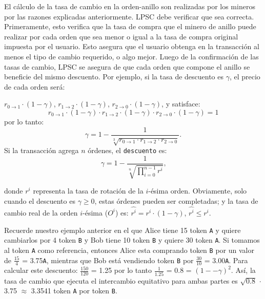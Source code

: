 \documentclass[UTF8,nofonts]{article}
\begin{document}
\begin{multicols}{2}
El c\'alculo de la tasa de cambio en la orden-anillo son realizadas por los mineros por las razones explicadas anteriormente. LPSC debe verificar que sea correcta. Primeramente, esto verifica que la tasa de compra que el minero de anillo puede realizar por cada orden que sea menor o igual a la tasa de compra original impuesta por el usuario. Esto asegura que el usuario obtenga en la transacci\'on al menos el tipo de cambio requerido, o algo mejor.			
Luego de la confirmaci\'on de las tasas de cambio, LPSC se asegura de que cada orden que compone el anillo se beneficie del mismo descuento. Por ejemplo, si la tasa de descuento es $\gamma$, el precio de cada orden ser\'a:

$r_{0\rightarrow 1} \cdot (1-\gamma)$, $r_{1\rightarrow 2} \cdot (1-\gamma)$, $r_{2 \rightarrow 0} \cdot (1-\gamma)$, y satisface: 
\begin{equation}
r_{0\rightarrow 1} \cdot (1-\gamma)\cdot r_{1\rightarrow 2} \cdot (1-\gamma) \cdot r_{2 \rightarrow 0} \cdot (1-\gamma) = 1
\end{equation}
por lo tanto: 
\begin{equation}
\gamma = 1- \frac{1}{\sqrt[3]{r_{0\rightarrow 1} \cdot r_{1\rightarrow 2} \cdot r_{2\rightarrow 0}}}\text{.}
\end{equation}
Si la transacci\'on agrega $n$ \'ordenes, el \texttt{descuento} es: 
\begin{equation}
\gamma = 1- \frac{1}{\sqrt[n]{\prod_{i=0}^{n-1} r^i}} \text{,}
\end{equation}

donde $r^i$ representa la tasa de rotaci\'on de la $i$-\'esima orden. Obviamente, solo cuando el descuento es $\gamma \ge 0$, estas \'ordenes pueden ser completadas; y la tasa de cambio real de la orden $i$-\'esima ($O^i$) es: $\hat{r^i} = r^i \cdot (1-\gamma)$, $\hat{r^i}\le r^i$.

Recuerde nuestro ejemplo anterior en el que Alice tiene 15 token \verb|A|  y quiere cambiarlos por 4 token \verb|B| y Bob tiene 10 token \verb|B| y quiere 30 token \verb|A|. Si tomamos al token \verb|A| como referencia, entonces Alice esta comprando token \verb|B| por un valor de $\frac{15}{4}$ = 3.75\verb|A|, mientras que Bob est\'a vendiendo token \verb|B| por $\frac{30}{10}$ = 3.00\verb|A|. Para calcular este descuento: $\frac{150}{120}$ = 1.25 por lo tanto $\frac{1}{1.25}$ = 0.8 = $(1 −- \gamma)^2$. As\'i, la tasa de cambio que ejecuta el intercambio equitativo para ambas partes es $\sqrt{0.8}$ $\cdot$ 3.75 $\approx$ 3.3541 token \verb|A| por token \verb|B|.


\end{multicols}
\end{document}

